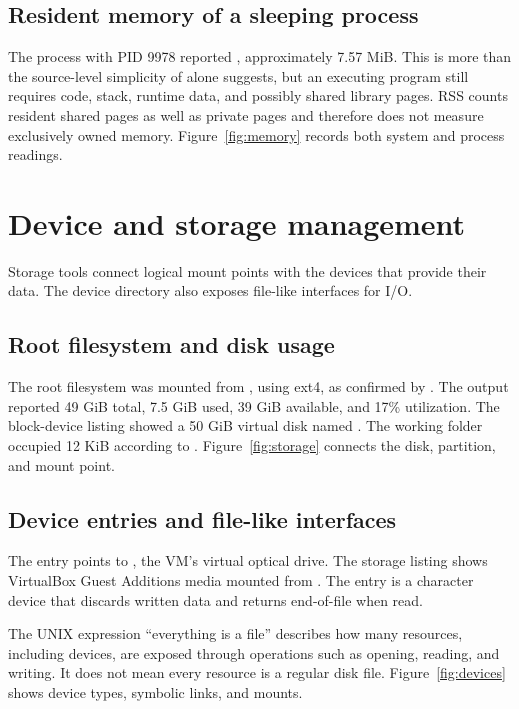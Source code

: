 \documentclass{../latex/utmreport}
\begin{document}
\section{Resident memory of a sleeping process}
The process with PID 9978 reported , approximately
7.57 MiB. This is more than the source-level simplicity of 
alone suggests, but an executing program still requires code, stack, runtime
data, and possibly shared library pages. RSS counts resident shared pages
as well as private pages and therefore does not measure exclusively owned
memory. Figure~\ref{fig:memory} records both system and process readings.

\chapter{Device and storage management}
Storage tools connect logical mount points with the devices that provide
their data. The device directory also exposes file-like interfaces for I/O.

\section{Root filesystem and disk usage}
The root filesystem \code{/} was mounted from , using
ext4, as confirmed by . The  output reported
49 GiB total, 7.5 GiB used, 39 GiB available, and 17\% utilization.
The block-device listing showed a 50 GiB virtual disk named .
The working folder occupied 12 KiB according to .
Figure~\ref{fig:storage} connects the disk, partition, and mount point.

\section{Device entries and file-like interfaces}
The entry  points to , the VM's virtual optical
drive. The storage listing shows VirtualBox Guest Additions media mounted
from . The entry  is a character device that
discards written data and returns end-of-file when read.

The UNIX expression ``everything is a file'' describes how many resources,
including devices, are exposed through operations such as opening, reading,
and writing. It does not mean every resource is a regular disk file.
Figure~\ref{fig:devices} shows device types, symbolic links, and mounts.
\end{document}
